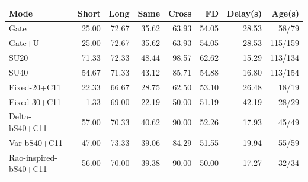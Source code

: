 \setlength{\tabcolsep}{3pt}\begin{tabular}{lrrrrrrr}\toprule
Mode & Short & Long & Same & Cross & FD & Delay(s) & Age(s) \\\midrule
Gate & 25.00 & 72.67 & 35.62 & 63.93 & 54.05 & 28.53 & 58/79 \\
Gate+U & 25.00 & 72.67 & 35.62 & 63.93 & 54.05 & 28.53 & 115/159 \\
SU20 & 71.33 & 72.33 & 48.44 & 98.57 & 62.62 & 15.29 & 113/134 \\
SU40 & 54.67 & 71.33 & 43.12 & 85.71 & 54.88 & 16.80 & 113/154 \\
Fixed-20+C11 & 22.33 & 66.67 & 28.75 & 62.50 & 53.10 & 26.48 & 18/19 \\
Fixed-30+C11 & 1.33 & 69.00 & 22.19 & 50.00 & 51.19 & 42.19 & 28/29 \\
Delta-bS40+C11 & 57.00 & 70.33 & 40.62 & 90.00 & 52.26 & 17.93 & 45/49 \\
Var-bS40+C11 & 47.00 & 73.33 & 39.06 & 84.29 & 51.55 & 19.94 & 55/59 \\
Rao-inspired-bS40+C11 & 56.00 & 70.00 & 39.38 & 90.00 & 50.00 & 17.27 & 32/34 \\
\bottomrule\end{tabular}

